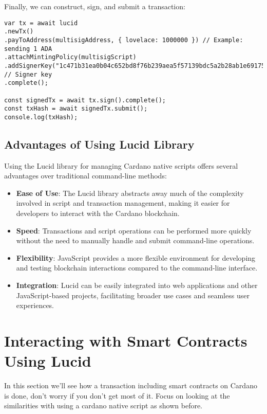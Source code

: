 Finally, we can construct, sign, and submit a transaction:

\begin{lstlisting}
var tx = await lucid
.newTx()
.payToAddress(multisigAddress, { lovelace: 1000000 }) // Example: sending 1 ADA
.attachMintingPolicy(multisigScript)
.addSignerKey("1c471b31ea0b04c652bd8f76b239aea5f57139bdc5a2b28ab1e69175") // Signer key
.complete();

const signedTx = await tx.sign().complete();
const txHash = await signedTx.submit();
console.log(txHash);
\end{lstlisting}

\subsection{Advantages of Using Lucid Library}

Using the Lucid library for managing Cardano native scripts offers several advantages over traditional command-line methods:

\begin{itemize}
\item \textbf{Ease of Use}: The Lucid library abstracts away much of the complexity involved in script and transaction management, making it easier for developers to interact with the Cardano blockchain.
\item \textbf{Speed}: Transactions and script operations can be performed more quickly without the need to manually handle and submit command-line operations.
\item \textbf{Flexibility}: JavaScript provides a more flexible environment for developing and testing blockchain interactions compared to the command-line interface.
\item \textbf{Integration}: Lucid can be easily integrated into web applications and other JavaScript-based projects, facilitating broader use cases and seamless user experiences.
\end{itemize}

\section{Interacting with Smart Contracts Using Lucid}

In this section we'll see how a transaction including smart contracts on Cardano is done, don't worry if you don't get most of it. Focus on looking at the similarities with using a cardano native script as shown before.

